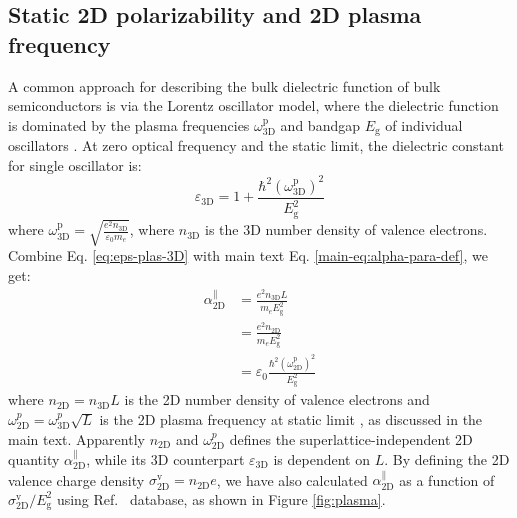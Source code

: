 \documentclass[journal=ancac3,email=true,hyperref=true,keywords=false]{achemso}
\begin{document}
\subsection{Static 2D polarizability and 2D plasma frequency}
\label{ssec:omega-p}

A common approach for describing the bulk dielectric function of bulk
semiconductors is via the Lorentz oscillator model, where the
dielectric function is dominated by the plasma frequencies
$\omega_{\mathrm{3D}}^{\mathrm{p}}$ and bandgap $E_{\mathrm{g}}$ of
individual oscillators \cite{ketterson_physics_2016}. At zero optical
frequency and the static limit, the dielectric constant for single
oscillator is:
\begin{equation}
  \label{eq:eps-plas-3D}
  \varepsilon_{\mathrm{3D}} = 1 +
  \frac{\hbar^{2} (\omega_{\mathrm{3D}}^{\mathrm{p}})^{2}}{E_{\mathrm{g}}^{2}}
\end{equation}
where
$\omega_{\mathrm{3D}}^{\mathrm{p}} = {\displaystyle \sqrt{\frac{e^{2}
      n_{\mathrm{3D}}}{\varepsilon_{0} m_{e}}}}$, where
$n_{\mathrm{3D}}$ is the 3D number density of valence
electrons. Combine Eq. \ref{eq:eps-plas-3D} with main text
Eq. \ref{main-eq:alpha-para-def}, we get:
\begin{equation}
  \begin{aligned}
  \label{eq:alpha-plas}
  \alpha_{\mathrm{2D}}^{\parallel} &= \frac{e^{2} n_{\mathrm{3D}} L}{m_{e} E_{\mathrm{g}}^{2}} \\
  &= \frac{e^{2} n_{\mathrm{2D}}}{m_{e} E_{\mathrm{g}}^{2}} \\
  &= \varepsilon_{0} \frac{\hbar^{2}
    (\omega_{\mathrm{2D}}^{\mathrm{p}})^{2}}{E_{\mathrm{g}}^{2}}
\end{aligned}
\end{equation}
where $n_{\mathrm{2D}} =n_{\mathrm{3D}} L$ is the 2D number density of
valence electrons and
$\omega_{\mathrm{2D}}^{p}=\omega_{\mathrm{3D}}^{p}\sqrt{L}$ is the 2D
plasma frequency at static limit \cite{Nazarov_2015_2D_3D}, as
discussed in the main text. Apparently $n_{\mathrm{2D}}$ and
$\omega_{\mathrm{2D}}^{p}$ defines the superlattice-independent 2D
quantity $\alpha_{\mathrm{2D}}^{\parallel}$, while its 3D counterpart
$\varepsilon_{\mathrm{3D}}$ is dependent on $L$. By defining the 2D
valence charge density
$\sigma_{\mathrm{2D}}^{\mathrm{v}}=n_{\mathrm{2D}}e$, we have also
calculated $\alpha_{\mathrm{2D}}^{\parallel}$ as a function of
$\sigma_{\mathrm{2D}}^{\mathrm{v}}/E_{\mathrm{g}}^{2}$ using Ref.~ database, as shown in Figure \ref{fig:plasma}.
\end{document}

